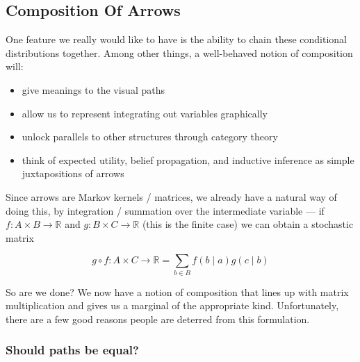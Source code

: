 \documentclass{article}
\begin{document}
	\subsection{Composition Of Arrows} \label{sec:composition}
	One feature we really would like to have is the ability to chain these conditional distributions together. Among other things, a well-behaved notion of composition will:
	\begin{itemize}[nosep]
		\item give meanings to the visual paths
		\item allow us to represent integrating out variables graphically
		\item unlock parallels to other structures through category theory
		\item think of expected utility, belief propagation, and inductive inference as simple juxtapositions of arrows
	\end{itemize} 
	
	Since arrows are Markov kernels / matrices, we already have a natural way of doing this, by integration / summation over the intermediate variable --- if $f : A \times B \to \mathbb R$ and $g : B \times C \to \mathbb R$ (this is the finite case) we can obtain a stochastic matrix
	
	\[ g\circ f : A \times C \to \mathbb R =  \sum_{b \in B} f( b \mid a) g(c \mid b) \]
	
	So are we done? We now have a notion of composition that lines up with matrix multiplication and gives us a marginal of the appropriate kind. Unfortunately, there are a few good reasons people are deterred from this formulation. 
	

	
	\subsubsection{Should paths be equal?}
	
\end{document}
